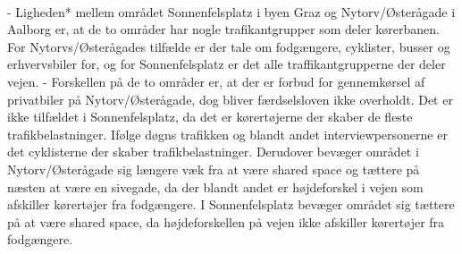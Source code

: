 \\

-	Ligheden* mellem området Sonnenfelsplatz i byen Graz og Nytorv/Østerågade i Aalborg er, at de to områder har nogle trafikantgrupper som deler kørerbanen. For Nytorvs/Østerågades tilfælde er der tale om fodgængere, cyklister, busser og erhvervsbiler for, og for Sonnenfelsplatz er det alle traffikantgrupperne der deler vejen.
-	Forskellen på de to områder er, at der er forbud for gennemkørsel af privatbiler på Nytorv/Østerågade, dog bliver færdselsloven ikke overholdt. Det er ikke tilfældet i Sonnenfelsplatz, da det er kørertøjerne der skaber de fleste trafikbelastninger. Ifølge døgns trafikken og blandt andet interviewpersonerne er det cyklisterne der skaber trafikbelastninger. Derudover bevæger området i Nytorv/Østerågade sig længere væk fra at være shared space og tættere på næsten at være en sivegade, da der blandt andet er højdeforskel i vejen som afskiller kørertøjer fra fodgængere. I Sonnenfelsplatz bevæger området sig tættere på at være shared space, da højdeforskellen på vejen ikke afskiller kørertøjer fra fodgængere. 

